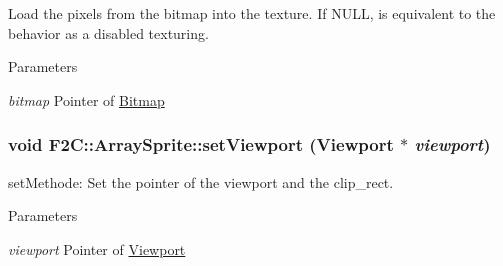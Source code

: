 Load the pixels from the bitmap into the texture. If NULL, is equivalent to the behavior as a disabled texturing. 
\begin{DoxyParams}{Parameters}
\item[{\em bitmap}]Pointer of \hyperlink{class_f2_c_1_1_bitmap}{Bitmap} \end{DoxyParams}
\hypertarget{class_f2_c_1_1_array_sprite_a960ba03bf1797621f00aaad269776dd2}{
\subsubsection[{setViewport}]{\setlength{\rightskip}{0pt plus 5cm}void F2C::ArraySprite::setViewport ({\bf Viewport} $\ast$ {\em viewport})}}
\label{class_f2_c_1_1_array_sprite_a960ba03bf1797621f00aaad269776dd2}


setMethode: Set the pointer of the viewport and the clip\_\-rect. 
\begin{DoxyParams}{Parameters}
\item[{\em viewport}]Pointer of \hyperlink{class_f2_c_1_1_viewport}{Viewport} \end{DoxyParams}
